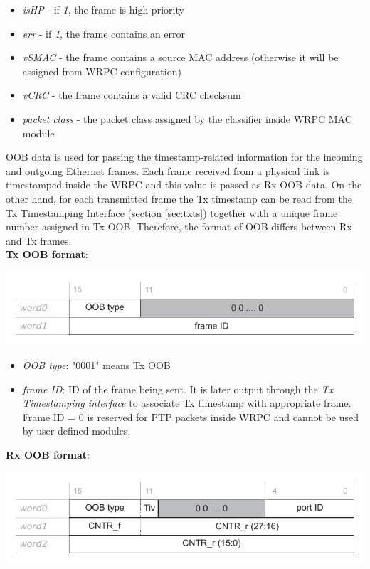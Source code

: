 \begin{itemize}
  \item[] \emph{isHP} - if \emph{1}, the frame is high priority
  \item[] \emph{err} - if \emph{1}, the frame contains an error
  \item[] \emph{vSMAC} - the frame contains a source MAC address (otherwise
    it will be assigned from WRPC configuration)
  \item[] \emph{vCRC} - the frame contains a valid CRC checksum
  \item[] \emph{packet class} - the packet class assigned by the classifier
    inside WRPC MAC module
\end{itemize}

OOB data is used for passing the timestamp-related information for the incoming and 
outgoing Ethernet frames. Each frame received from a physical link is
timestamped inside the WRPC and this value is passed as Rx OOB
data. On the other hand, for each transmitted frame the Tx timestamp can be read
from the Tx Timestamping Interface (section \ref{sec:txts}) together with a unique
frame number assigned in Tx OOB. Therefore, the format of OOB differs between Rx
and Tx frames.\\

{\bf Tx OOB format}:

  \begin{center}
    \includegraphics[width=.7\textwidth]{fig/oob_tx.pdf}
  \end{center}

\begin{itemize}
  \item[] \emph{OOB type}: "0001" means Tx OOB
  \item[] \emph{frame ID}: ID of the frame being sent. It is later output
    through the \emph{Tx Timestamping interface} to associate Tx timestamp with
    appropriate frame. Frame ID = 0 is reserved for PTP packets inside WRPC
    and cannot be used by user-defined modules.
\end{itemize}

{\bf Rx OOB format}:
  \begin{center}
    \includegraphics[width=.7\textwidth]{fig/oob_rx.pdf}
  \end{center}

